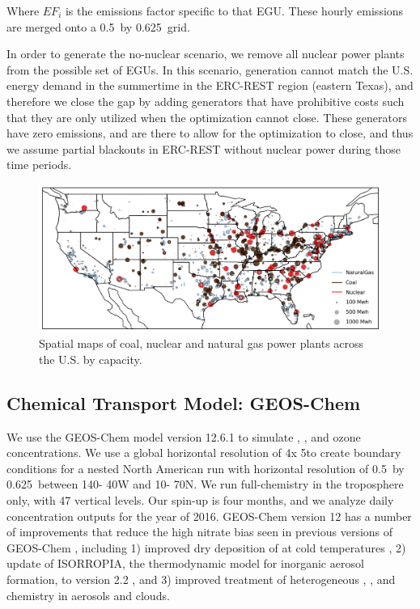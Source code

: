\documentclass[12]{article}
\begin{document}
Where $EF_i$ is the emissions factor specific to that EGU. These hourly emissions are merged onto a 0.5\textdegree~by 0.625\textdegree~grid. 

In order to generate the no-nuclear scenario, we remove all nuclear power plants from the possible set of EGUs. In this scenario, generation cannot match the U.S. energy demand in the summertime in the ERC-REST region (eastern Texas), and therefore we close the gap by adding generators that have prohibitive costs such that they are only utilized when the optimization cannot close. These generators have zero emissions, and are there to allow for the optimization to close, and thus we assume partial blackouts in ERC-REST  without nuclear power during those time periods. 

\begin{figure}
    \centering
    \includegraphics[width=1.\textwidth]{ego_nonuclear_project/Figures/plants_normal.png}
    \caption{Spatial maps of coal, nuclear and natural gas power plants across the U.S. by capacity.} 
    \label{fig:plants}
\end{figure}

\subsection{Chemical Transport Model: GEOS-Chem}
We use the GEOS-Chem model version 12.6.1 \citep{bey_global_2001} to simulate , ,  and ozone concentrations. We use a global horizontal resolution of 4\textdegree x 5\textdegree to create boundary conditions for a nested North American run with horizontal resolution of 0.5\textdegree~by 0.625\textdegree~between 140\textdegree - 40\textdegree W and 10\textdegree - 70\textdegree N. We run full-chemistry in the troposphere only, with 47 vertical levels. Our spin-up is four months, and we analyze daily concentration outputs for the year of 2016. GEOS-Chem version 12 has a number of improvements that reduce the high nitrate bias seen in previous versions of GEOS-Chem \citep{walker_simulation_2012}, including 1) improved dry deposition of  at cold temperatures \citep{jaegle_nitrogen_2018}, 2) update of ISORROPIA, the thermodynamic model for inorganic aerosol formation, to version 2.2 \citep{fountoukis_isorropia_2007}, and 3) improved treatment of heterogeneous , , and  chemistry in aerosols and clouds.
\end{document}
